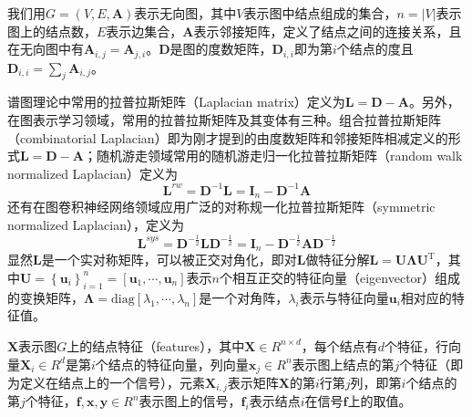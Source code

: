 \documentclass[final]{cvpr}
\begin{document}
我们用$G=\left( V,E,\boldsymbol{A} \right)$表示无向图，其中$V$表示图中结点组成的集合，$n = \left| V \right|$表示图上的结点数，$E$表示边集合，$\boldsymbol{A}$表示邻接矩阵，定义了结点之间的连接关系，且在无向图中有$\boldsymbol{A}_{i,j}=\boldsymbol{A}_{j,i}$。$\boldsymbol{D}$是图的度数矩阵，$\boldsymbol{D}_{i,i}$即为第$i$个结点的度且$\boldsymbol{D}_{i,i} = \sum_j \boldsymbol{A}_{i,j}$。

谱图理论中常用的拉普拉斯矩阵（Laplacian matrix）定义为$\boldsymbol{L} = \boldsymbol{D}-\boldsymbol{A}$。另外，在图表示学习领域，常用的拉普拉斯矩阵及其变体有三种。组合拉普拉斯矩阵（combinatorial Laplacian）即为刚才提到的由度数矩阵和邻接矩阵相减定义的形式$\boldsymbol{L} = \boldsymbol{D}-\boldsymbol{A}$；随机游走领域常用的随机游走归一化拉普拉斯矩阵（random walk normalized Laplacian）定义为
\begin{equation}
    \boldsymbol{L}^{rw} 
    = \boldsymbol{D}^{-1}\boldsymbol{L}
    = \boldsymbol{I}_n - \boldsymbol{D}^{-1}\boldsymbol{A}
\end{equation}
还有在图卷积神经网络领域应用广泛的对称规一化拉普拉斯矩阵（symmetric normalized Laplacian），定义为
\begin{equation}
    \boldsymbol{L}^{sys} 
    = \boldsymbol{D}^{-\frac{1}{2}}\boldsymbol{L}\boldsymbol{D}^{-\frac{1}{2}}
    = \boldsymbol{I}_n - 
    \boldsymbol{D}^{-\frac{1}{2}}\boldsymbol{A}\boldsymbol{D}^{-\frac{1}{2}}
\end{equation}
显然$\boldsymbol{L}$是一个实对称矩阵，可以被正交对角化，即对$\boldsymbol{L}$做特征分解$\boldsymbol{L}=\boldsymbol{U}\boldsymbol{\Lambda}\boldsymbol{U}^{\mathrm{T}}$，其中$\boldsymbol{U}=\left\{ \boldsymbol{u}_i \right\}_{i=1}^n
= \left[ \boldsymbol{u}_1,\cdots,\boldsymbol{u}_n \right]$表示$n$个相互正交的特征向量（eigenvector）组成的变换矩阵，$\boldsymbol{\Lambda}
= \mathrm{diag} \left[ \lambda_1,\cdots,\lambda_n \right] $是一个对角阵，$\lambda_i$表示与特征向量$\boldsymbol{u}_i$相对应的特征值。

$\boldsymbol{X}$表示图$G$上的结点特征（features），其中$\boldsymbol{X} \in R^{n \times d}$，每个结点有$d$个特征，行向量$\boldsymbol{X}_i \in R^d$是第$i$个结点的特征向量，列向量$\boldsymbol{x}_j \in R^n$表示图上结点的第$j$个特征（即为定义在结点上的一个信号），元素$\boldsymbol{X}_{i,j}$表示矩阵$\boldsymbol{X}$的第$i$行第$j$列，即第$i$个结点的第$j$个特征，$\boldsymbol{f},\boldsymbol{x},\boldsymbol{y} \in R^n$表示图上的信号，$\boldsymbol{f}_i$表示结点$i$在信号$\boldsymbol{f}$上的取值。
\end{document}
